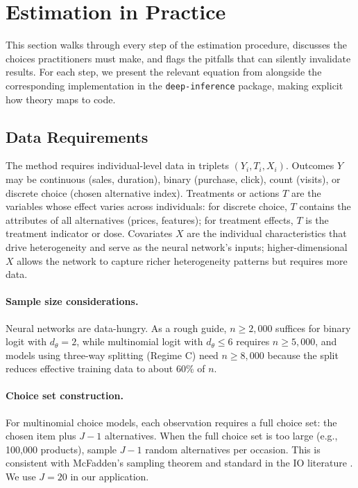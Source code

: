 \section{Estimation in Practice}\label{sec:estimation}

This section walks through every step of the estimation procedure, discusses the choices practitioners must make, and flags the pitfalls that can silently invalidate results. For each step, we present the relevant equation from \citet{farrell2025deep} alongside the corresponding implementation in the \texttt{deep-inference} package, making explicit how theory maps to code.

\subsection{Data Requirements}

The method requires individual-level data in triplets $(Y_i, T_i, X_i)$. Outcomes $Y$ may be continuous (sales, duration), binary (purchase, click), count (visits), or discrete choice (chosen alternative index). Treatments or actions $T$ are the variables whose effect varies across individuals: for discrete choice, $T$ contains the attributes of all alternatives (prices, features); for treatment effects, $T$ is the treatment indicator or dose. Covariates $X$ are the individual characteristics that drive heterogeneity and serve as the neural network's inputs; higher-dimensional $X$ allows the network to capture richer heterogeneity patterns but requires more data.

\paragraph{Sample size considerations.} Neural networks are data-hungry. As a rough guide, $n \geq 2{,}000$ suffices for binary logit with $d_\theta = 2$, while multinomial logit with $d_\theta \leq 6$ requires $n \geq 5{,}000$, and models using three-way splitting (Regime C) need $n \geq 8{,}000$ because the split reduces effective training data to about 60\% of $n$.

\paragraph{Choice set construction.} For multinomial choice models, each observation requires a full choice set: the chosen item plus $J-1$ alternatives. When the full choice set is too large (e.g., 100,000 products), sample $J-1$ random alternatives per occasion. This is consistent with McFadden's sampling theorem and standard in the IO literature \citep{train2009discrete}. We use $J = 20$ in our application.

